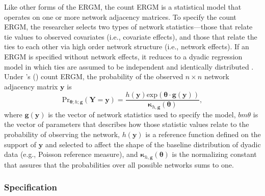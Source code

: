 \documentclass{article}
\newcommand\citeapos[1]{\citeauthor{#1}'s (\citeyear{#1})}
\begin{document}
Like other forms of the ERGM, the count ERGM is a statistical model that operates on one or more network adjacency matrices. To specify the count ERGM, the researcher selects two types of network statistics---those that relate tie values to observed covariates (i.e., covariate effects), and those that relate the ties to each other via high order network structure (i.e., network effects). If an ERGM is specified without network effects, it reduces to a dyadic regression model in which ties are assumed to be independent and identically distributed \cite{cranmer2011inferential}. Under \citeapos{krivitsky2012exponential} count ERGM, the probability of the observed $n \times n$ network adjacency matrix $\bm{y}$ is $$ \text{Pr}_{\bm{\theta};h;\bm{g}}( \bm{Y}=\bm{y} )=\frac{ h(\bm{y})\text{exp}( \bm{\theta} \cdot \bm{g} (\bm{y}) )}{\bm{\kappa}_{h,\bm{g}}(\bm{\theta})},$$ where $\bm{g}( \bm{y} )$ is the vector of network statistics used to specify the model, $bm{\theta}$ is the vector of parameters that describes how those statistic values relate to the probability of observing the network, $h(\bm{y})$ is a reference function defined on the support of $\bm{y}$ and selected to affect the shape of the baseline distribution of dyadic data (e.g., Poisson reference measure), and $\bm{\kappa}_{h,\bm{g}}(\bm{\theta})$ is the normalizing constant that assures that the probabilities over all possible networks sums to one.


\subsubsection{Specification}
\end{document}
